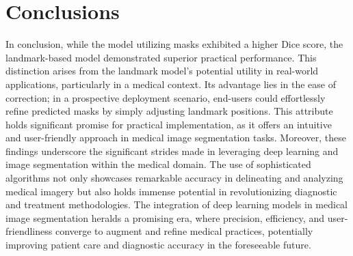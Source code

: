\documentclass[runningheads]{llncs}
\begin{document}
\section{Conclusions}
In conclusion, while the model utilizing masks exhibited a higher Dice score, the landmark-based model demonstrated superior practical performance. This distinction arises from the landmark model's potential utility in real-world applications, particularly in a medical context. Its advantage lies in the ease of correction; in a prospective deployment scenario, end-users could effortlessly refine predicted masks by simply adjusting landmark positions. This attribute holds significant promise for practical implementation, as it offers an intuitive and user-friendly approach in medical image segmentation tasks. Moreover, these findings underscore the significant strides made in leveraging deep learning and image segmentation within the medical domain. The use of sophisticated algorithms not only showcases remarkable accuracy in delineating and analyzing medical imagery but also holds immense potential in revolutionizing diagnostic and treatment methodologies. The integration of deep learning models in medical image segmentation heralds a promising era, where precision, efficiency, and user-friendliness converge to augment and refine medical practices, potentially improving patient care and diagnostic accuracy in the foreseeable future.


\newpage
\end{document}
